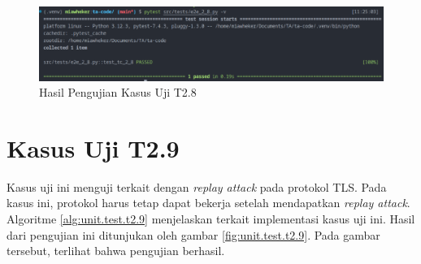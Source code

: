\begin{figure}[ht]
  \centering
  \includegraphics[width=\textwidth]{chapters/res/appendix-4/2.8.png}
  \caption{Hasil Pengujian Kasus Uji T2.8}
  \label{fig:unit.test.t2.8}
\end{figure}

\section{Kasus Uji T2.9}

Kasus uji ini menguji terkait dengan \emph{replay attack} pada protokol TLS. Pada kasus ini, protokol harus tetap dapat bekerja setelah mendapatkan \emph{replay attack}. Algoritme \ref{alg:unit.test.t2.9} menjelaskan terkait implementasi kasus uji ini. Hasil dari pengujian ini ditunjukan oleh gambar \ref{fig:unit.test.t2.9}. Pada gambar tersebut, terlihat bahwa pengujian berhasil.


